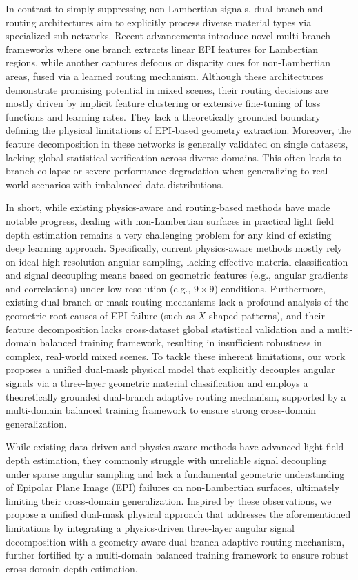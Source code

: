 \documentclass[lettersize,journal]{IEEEtran}
\begin{document}
In contrast to simply suppressing non-Lambertian signals, dual-branch and routing architectures aim to explicitly process diverse material types via specialized sub-networks. Recent advancements \cite{dual_branch_network,routing_mechanism,mixture_of_experts_light_field} introduce novel multi-branch frameworks where one branch extracts linear EPI features for Lambertian regions, while another captures defocus or disparity cues for non-Lambertian areas, fused via a learned routing mechanism. Although these architectures demonstrate promising potential in mixed scenes, their routing decisions are mostly driven by implicit feature clustering or extensive fine-tuning of loss functions and learning rates. They lack a theoretically grounded boundary defining the physical limitations of EPI-based geometry extraction. Moreover, the feature decomposition in these networks is generally validated on single datasets, lacking global statistical verification across diverse domains. This often leads to branch collapse or severe performance degradation when generalizing to real-world scenarios with imbalanced data distributions.

In short, while existing physics-aware and routing-based methods have made notable progress, dealing with non-Lambertian surfaces in practical light field depth estimation remains a very challenging problem for any kind of existing deep learning approach. Specifically, current physics-aware methods mostly rely on ideal high-resolution angular sampling, lacking effective material classification and signal decoupling means based on geometric features (e.g., angular gradients and correlations) under low-resolution (e.g., $9 \times 9$) conditions. Furthermore, existing dual-branch or mask-routing mechanisms lack a profound analysis of the geometric root causes of EPI failure (such as $X$-shaped patterns), and their feature decomposition lacks cross-dataset global statistical validation and a multi-domain balanced training framework, resulting in insufficient robustness in complex, real-world mixed scenes. To tackle these inherent limitations, our work proposes a unified dual-mask physical model that explicitly decouples angular signals via a three-layer geometric material classification and employs a theoretically grounded dual-branch adaptive routing mechanism, supported by a multi-domain balanced training framework to ensure strong cross-domain generalization.

While existing data-driven and physics-aware methods have advanced light field depth estimation, they commonly struggle with unreliable signal decoupling under sparse angular sampling and lack a fundamental geometric understanding of Epipolar Plane Image (EPI) failures on non-Lambertian surfaces, ultimately limiting their cross-domain generalization. Inspired by these observations, we propose a unified dual-mask physical approach that addresses the aforementioned limitations by integrating a physics-driven three-layer angular signal decomposition with a geometry-aware dual-branch adaptive routing mechanism, further fortified by a multi-domain balanced training framework to ensure robust cross-domain depth estimation.
\end{document}
